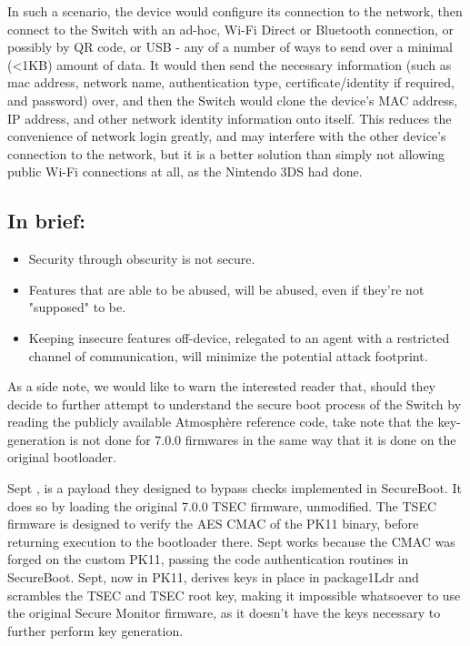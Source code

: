 \documentclass[journal]{IEEEtran}
\begin{document}
In such a scenario, the device would configure its connection to the network, then connect to the
Switch with an ad-hoc, Wi-Fi Direct or Bluetooth connection, or possibly by QR code, or USB - any
of a number of ways to send over a minimal (<1KB) amount of data. It would then send the necessary
information (such as mac address, network name, authentication type, certificate/identity if
required, and password) over, and then the Switch would clone the device's MAC address, IP address,
and other network identity information onto itself.
This reduces the convenience of network login greatly, and may interfere with the other device's
connection to the network, but it is a better solution than simply not allowing public Wi-Fi
connections at all, as the Nintendo 3DS had done.

\subsection*{In brief:}
\begin{itemize}
\item Security through obscurity is not secure.
\item Features that are able to be abused, will be abused, even if they're not "supposed" to be.
\item Keeping insecure features off-device, relegated to an agent with a restricted channel of
communication, will minimize the potential attack footprint.
\end{itemize}

\fi

As a side note, we would like to warn the interested reader that, should they decide to further
attempt to understand the secure boot process of the Switch by reading the publicly available
Atmosphère \cite{atmosphere} reference code, take note that the key-generation is not done for
7.0.0 firmwares in the same way that it is done on the original bootloader.

Sept \cite{sept}, is a payload they designed to bypass checks implemented in SecureBoot. It does so
by loading the original 7.0.0 TSEC firmware, unmodified. The TSEC firmware is designed to verify
the AES CMAC of the PK11 binary, before returning execution to the bootloader there. 
Sept works because the CMAC was forged on the custom PK11, passing the code authentication routines
in SecureBoot. Sept, now in PK11, derives keys in place in package1Ldr
and scrambles the TSEC and TSEC root key, making it impossible whatsoever to use the original
Secure Monitor firmware, as it doesn't have the keys necessary to further perform key generation.
\end{document}
